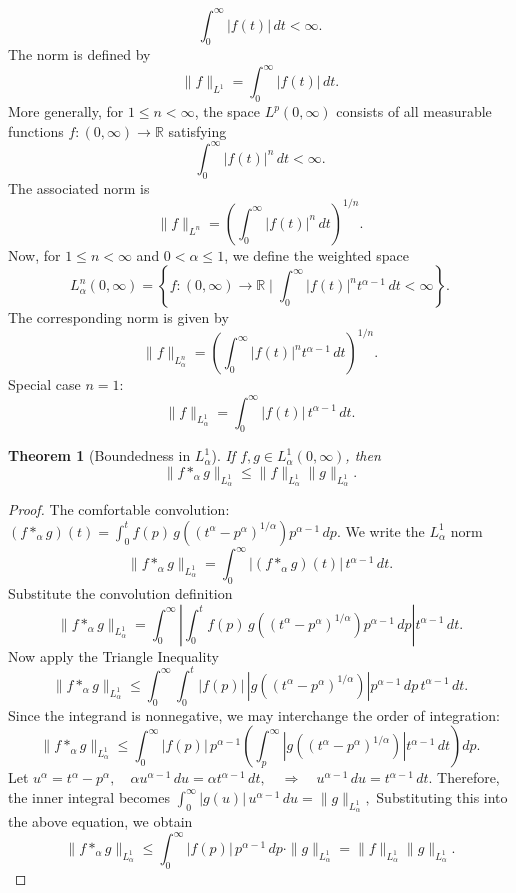 \documentclass[two side,reqno,12pt]{amsart}
\numberwithin{equation}{section}
\newtheorem{theorem}[lemma]{Theorem}
\theoremstyle{definition}
\begin{document}
\[
\int_0^\infty |f(t)| \, dt < \infty.
\]
The norm is defined by
\[
\|f\|_{L^1} = \int_0^\infty |f(t)| \, dt.
\]
More generally, for $1 \leq n < \infty$, the space $L^p(0,\infty)$ consists of all measurable functions $f:(0,\infty)\to \mathbb{R}$ satisfying
\[
\int_0^\infty |f(t)|^n \, dt < \infty.
\]
The associated norm is
\[
\|f\|_{L^n} = \left( \int_0^\infty |f(t)|^n \, dt \right)^{1/n}.
\]
Now, for $1 \leq n < \infty$ and $0 < \alpha \leq 1$, we define the weighted space
\[
L^n_\alpha(0,\infty) = \left\{ f:(0,\infty)\to \mathbb{R} \;\Big|\; \int_0^\infty |f(t)|^n t^{\alpha-1} \, dt < \infty \right\}.
\]
The corresponding norm is given by
\[
\|f\|_{L^n_\alpha} = \left( \int_0^\infty |f(t)|^n t^{\alpha-1} \, dt \right)^{1/n}.
\]
Special case $n=1$:
\[
\|f\|_{L^1_\alpha} = \int_0^\infty |f(t)| \, t^{\alpha-1} \, dt.
\]
\begin{theorem}[Boundedness in $L^1_\alpha$]
If $f, g \in L^1_\alpha(0,\infty)$, then
\[
\|f *_\alpha g\|_{L^1_\alpha} \leq \|f\|_{L^1_\alpha} \|g\|_{L^1_\alpha}.
\]
\end{theorem}
\begin{proof}
The comfortable convolution:
$
(f *_\alpha g)(t) = \int_0^t f(p) \, g\!\left((t^\alpha - p^\alpha)^{1/\alpha}\right) p^{\alpha-1} \, dp.
$
We write the $L^1_\alpha$ norm
\[
\|f *_\alpha g\|_{L^1_\alpha} = \int_0^\infty |(f *_\alpha g)(t)| \, t^{\alpha-1} \, dt.
\]
Substitute the convolution definition
\[
\|f *_\alpha g\|_{L^1_\alpha} = \int_0^\infty \left| \int_0^t f(p) \, g\!\left((t^\alpha - p^\alpha)^{1/\alpha}\right) p^{\alpha-1} \, dp \right| t^{\alpha-1} \, dt.
\]
Now apply the Triangle Inequality
\[
\|f *_\alpha g\|_{L^1_\alpha} \leq \int_0^\infty \int_0^t |f(p)| \, \left| g\!\left((t^\alpha - p^\alpha)^{1/\alpha}\right) \right| p^{\alpha-1} \, dp \, t^{\alpha-1} \, dt.
\]
Since the integrand is nonnegative, we may interchange the order of integration:
\[
\|f *_\alpha g\|_{L^1_\alpha} \leq \int_0^\infty |f(p)| \, p^{\alpha-1} \left( \int_p^\infty \left| g\!\left((t^\alpha - p^\alpha)^{1/\alpha}\right) \right| t^{\alpha-1} \, dt \right) dp.
\]
Let
$ u^\alpha = t^\alpha - p^\alpha, \quad \alpha u^{\alpha-1} \, du = \alpha t^{\alpha-1} \, dt, \quad\Rightarrow\quad u^{\alpha-1} \, du = t^{\alpha-1} \, dt.$
Therefore, the inner integral becomes
$
\int_0^\infty |g(u)| \, u^{\alpha-1} \, du = \|g\|_{L^1_\alpha},
$
Substituting this into the above equation, we obtain
\[
\|f *_\alpha g\|_{L^1_\alpha} \leq \int_0^\infty |f(p)| \, p^{\alpha-1} \, dp \cdot \|g\|_{L^1_\alpha}
= \|f\|_{L^1_\alpha} \|g\|_{L^1_\alpha}.
\]
\end{proof}
\end{document}
